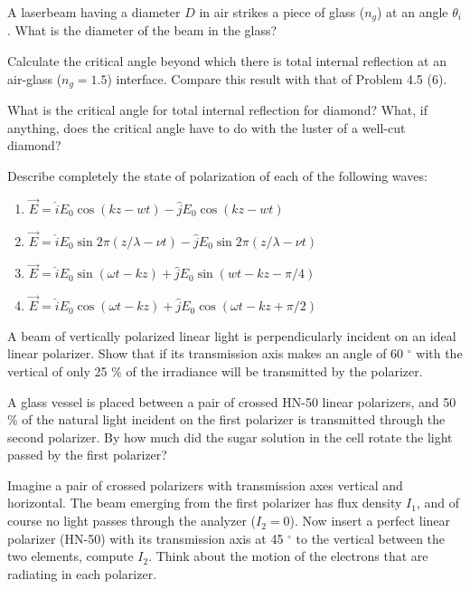 \documentclass[addpoints,10pt]{exam}
\begin{document}
\begin{questions}
		{	\question
			A laserbeam having a diameter $D$ in air strikes a piece of glass ($n_{g}$) at an angle $\theta_i$. What is the diameter of the beam in the glass?
		}
		
		{
			\question
			Calculate the critical angle beyond which there is total internal reflection at an air-glass ($n_g = 1.5$) interface. Compare this result with that of Problem 4.5 (6).
		}
		
		{
			\question
			What is the critical angle for total internal reflection for diamond? What, if anything, does the critical angle have to do with the luster of a well-cut diamond?
		}

		{
			\question
			Describe completely the state of polarization of each of the following waves:
			\begin{enumerate}
				\item $\vec{E} = \hat{i} E_0\cos(kz-wt) - \hat{j}E_0\cos(kz - wt)$
				\item $\vec{E} = \hat{i}E_0\sin2\pi(z/\lambda - \nu t) - \hat{j}E_0\sin2\pi(z/\lambda - \nu t)$
				\item $\vec{E} = \hat{i}E_0\sin(\omega t -kz) + \hat{j}E_0\sin(wt-kz-\pi/4)$
				\item $\vec{E} = \hat{i}E_0\cos(\omega t - kz) + \hat{j}E_0\cos(\omega t - kz + \pi/2)$
			\end{enumerate}
		}
		
		{
			\question
			A beam of vertically polarized linear light is perpendicularly incident on an ideal linear polarizer. Show that if its transmission axis makes an angle of 60 $^\circ$ with the vertical of only 25 \% of the irradiance will be transmitted by the polarizer.
		}
		
		{
			\question
			A glass vessel is placed between a pair of crossed HN-50 linear polarizers, and 50 \% of the natural light incident on the first polarizer is transmitted through the second polarizer. By how much did the sugar solution in the cell rotate the light passed by the first polarizer?
		}
		
		{
			\question
			Imagine a pair of crossed polarizers with transmission axes vertical and horizontal. The beam emerging from the first polarizer has flux density $I_1$, and of course no light passes through the analyzer ($I_2 = 0$). Now insert a perfect linear polarizer (HN-50) with its transmission axis at 45 $^\circ$ to the vertical between the two elements, compute $I_2$. Think about the motion of the electrons that are radiating in each polarizer.
		}
		

\end{questions}
\end{document}
